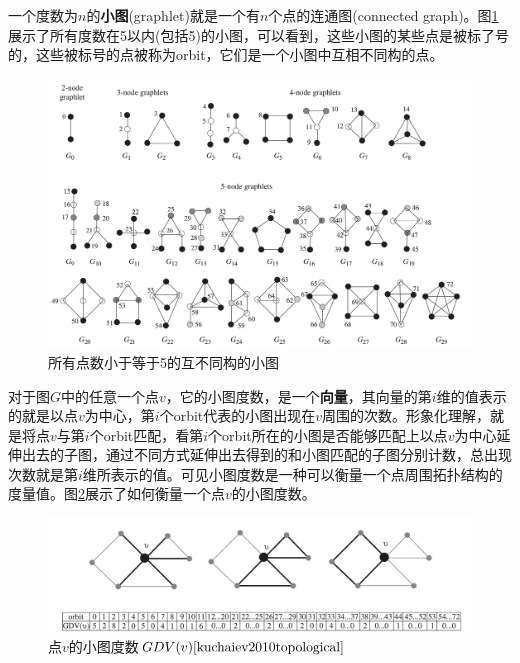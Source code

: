 一个度数为$n$的\textbf{小图}(graphlet)就是一个有$n$个点的连通图(connected graph)。图\ref{fig:graphlet}展示了所有度数在5以内(包括5)的小图，可以看到，这些小图的某些点是被标了号的，这些被标号的点被称为orbit，它们是一个小图中互相不同构的点。

\begin{figure}[htbp]
\centering
\includegraphics[width=\textwidth]{pic/graphlet.png}
\captionsetup{margin=50pt}
\caption{所有点数小于等于5的互不同构的小图\cite{kuchaiev2010topological}}\label{fig:graphlet}
\end{figure}

对于图$G$中的任意一个点$v$，它的小图度数，是一个\textbf{向量}，其向量的第$i$维的值表示的就是以点$v$为中心，第$i$个orbit代表的小图出现在$v$周围的次数。形象化理解，就是将点$v$与第$i$个orbit匹配，看第$i$个orbit所在的小图是否能够匹配上以点$v$为中心延伸出去的子图，通过不同方式延伸出去得到的和小图匹配的子图分别计数，总出现次数就是第$i$维所表示的值。可见小图度数是一种可以衡量一个点周围拓扑结构的度量值。图\ref{fig:orbitcount}展示了如何衡量一个点$v$的小图度数。

\begin{figure}[htbp]
\centering
\includegraphics[width=\textwidth]{pic/orbitcount.png}
\captionsetup{margin=50pt}
\caption{点$v$的小图度数$GDV(v)\cite{kuchaiev2010topological}$}\label{fig:orbitcount}
\end{figure}

